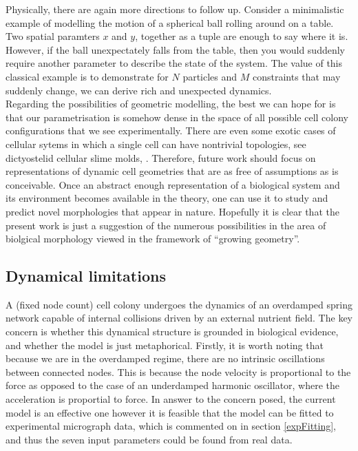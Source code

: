 Physically, there are again more directions to follow up. Consider a minimalistic 
example of modelling the motion of a spherical ball rolling around on a table.
Two spatial paramters $x$ and $y$, together as a tuple are enough to say where it is. However, 
if the ball unexpectately falls from the table, then you would suddenly require
another parameter to describe the state of the system. The value of this classical example
is to demonstrate for $N$ particles and $M$ constraints that may suddenly change, 
we can derive rich and unexpected dynamics.
\\

Regarding the possibilities of geometric modelling, the best we can hope for is that 
our parametrisation is somehow dense in the space
of all possible cell colony configurations that we see experimentally. There are even
some exotic cases of cellular sytems in which a single cell can have nontrivial topologies, 
see dictyostelid cellular slime molds, \cite{glockner2016multicellularity}. Therefore, future work 
should focus on representations of dynamic cell geometries that are as free of assumptions as
is conceivable. Once an abstract enough representation of a biological system and its environment
becomes available in the theory, one can use it to study and predict novel morphologies that appear 
in nature. Hopefully it is clear that the present work is just a suggestion of the numerous possibilities
in the area of biolgical morphology viewed in the framework of ``growing geometry''.

\subsection{Dynamical limitations}
A (fixed node count) cell colony undergoes the dynamics of an overdamped spring network capable
of internal collisions driven by
an external nutrient field. The key concern is whether this dynamical structure is grounded in 
biological evidence, and whether the model is just metaphorical. Firstly, 
it is worth noting that because we are in the overdamped regime,
there are no intrinsic oscillations between connected nodes. This is because the node velocity 
is proportional to the force as opposed to the case 
of an underdamped harmonic oscillator, where the acceleration is proportial to force.
In answer to the concern posed, the current model is an effective one however
it is feasible that the model can be fitted to experimental micrograph data, 
which is commented on in section \ref{expFitting}, and thus the seven input parameters 
could be found from real data.
\\

